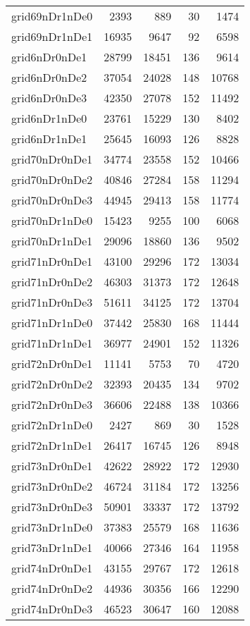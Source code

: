 \begin{longtable}{lrrrr}
grid69nDr1nDe0 & 2393 & 889 & 30 & 1474 \\
grid69nDr1nDe1 & 16935 & 9647 & 92 & 6598 \\
grid6nDr0nDe1 & 28799 & 18451 & 136 & 9614 \\
grid6nDr0nDe2 & 37054 & 24028 & 148 & 10768 \\
grid6nDr0nDe3 & 42350 & 27078 & 152 & 11492 \\
grid6nDr1nDe0 & 23761 & 15229 & 130 & 8402 \\
grid6nDr1nDe1 & 25645 & 16093 & 126 & 8828 \\
grid70nDr0nDe1 & 34774 & 23558 & 152 & 10466 \\
grid70nDr0nDe2 & 40846 & 27284 & 158 & 11294 \\
grid70nDr0nDe3 & 44945 & 29413 & 158 & 11774 \\
grid70nDr1nDe0 & 15423 & 9255 & 100 & 6068 \\
grid70nDr1nDe1 & 29096 & 18860 & 136 & 9502 \\
grid71nDr0nDe1 & 43100 & 29296 & 172 & 13034 \\
grid71nDr0nDe2 & 46303 & 31373 & 172 & 12648 \\
grid71nDr0nDe3 & 51611 & 34125 & 172 & 13704 \\
grid71nDr1nDe0 & 37442 & 25830 & 168 & 11444 \\
grid71nDr1nDe1 & 36977 & 24901 & 152 & 11326 \\
grid72nDr0nDe1 & 11141 & 5753 & 70 & 4720 \\
grid72nDr0nDe2 & 32393 & 20435 & 134 & 9702 \\
grid72nDr0nDe3 & 36606 & 22488 & 138 & 10366 \\
grid72nDr1nDe0 & 2427 & 869 & 30 & 1528 \\
grid72nDr1nDe1 & 26417 & 16745 & 126 & 8948 \\
grid73nDr0nDe1 & 42622 & 28922 & 172 & 12930 \\
grid73nDr0nDe2 & 46724 & 31184 & 172 & 13256 \\
grid73nDr0nDe3 & 50901 & 33337 & 172 & 13792 \\
grid73nDr1nDe0 & 37383 & 25579 & 168 & 11636 \\
grid73nDr1nDe1 & 40066 & 27346 & 164 & 11958 \\
grid74nDr0nDe1 & 43155 & 29767 & 172 & 12618 \\
grid74nDr0nDe2 & 44936 & 30356 & 166 & 12290 \\
grid74nDr0nDe3 & 46523 & 30647 & 160 & 12088 \\

\end{longtable}
